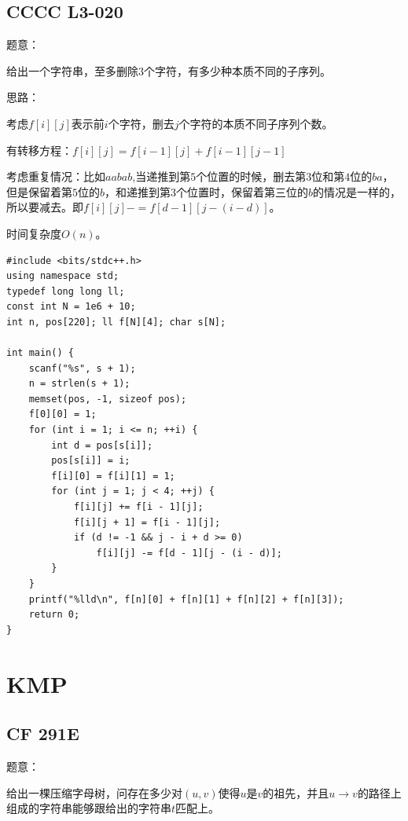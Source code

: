 \subsection{CCCC L3-020}

题意：\par
给出一个字符串，至多删除$3$个字符，有多少种本质不同的子序列。\par

思路：\par

考虑$f[i][j]$表示前$i$个字符，删去$j$个字符的本质不同子序列个数。\par
有转移方程：$\displaystyle f[i][j] = f[i - 1][j] + f[i - 1][j - 1]$\par

考虑重复情况：比如$aabab$,当递推到第$5$个位置的时候，删去第$3$位和第$4$位的$ba$，但是保留着第$5$位的$b$，和递推到第$3$个位置时，保留着第三位的$b$的情况是一样的，所以要减去。即$\displaystyle f[i][j] -= f[d - 1][j - (i - d)]$。\par

时间复杂度$O(n)$。\par

\begin{lstlisting}
#include <bits/stdc++.h>
using namespace std;
typedef long long ll;
const int N = 1e6 + 10;
int n, pos[220]; ll f[N][4]; char s[N];

int main() {
	scanf("%s", s + 1);
	n = strlen(s + 1);
	memset(pos, -1, sizeof pos);
	f[0][0] = 1;
	for (int i = 1; i <= n; ++i) {
		int d = pos[s[i]];
		pos[s[i]] = i;
		f[i][0] = f[i][1] = 1;
		for (int j = 1; j < 4; ++j) {
			f[i][j] += f[i - 1][j];
			f[i][j + 1] = f[i - 1][j];
			if (d != -1 && j - i + d >= 0)
				f[i][j] -= f[d - 1][j - (i - d)];
		}
	}
	printf("%lld\n", f[n][0] + f[n][1] + f[n][2] + f[n][3]);
	return 0;
}
\end{lstlisting}

\section{KMP}
\subsection{CF 291E}

题意：\par
给出一棵压缩字母树，问存在多少对$(u, v)$使得$u$是$v$的祖先，并且$u \rightarrow v $的路径上组成的字符串能够跟给出的字符串$t$匹配上。\par

